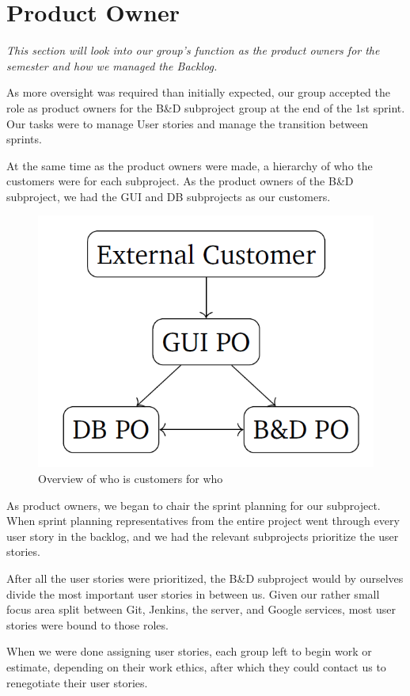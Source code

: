 \section{Product Owner} \label{Roles_SecProductOwner}
\textit{This section will look into our group’s function as the product owners for the semester and how we managed the Backlog.}

As more oversight was required than initially expected, our group accepted the role as product owners for the B\&D subproject group at the end of the 1st sprint. Our tasks were to manage User stories and manage the transition between sprints.

At the same time as the product owners were made, a hierarchy of who the customers were for each subproject. As the product owners of the B\&D subproject, we had the GUI and DB subprojects as our customers.

 \begin{figure}[H]
 	\centering
 	\includegraphics[width=0.8 \textwidth]{pictures/ProductOwnerRelation.png}
 	\caption{Overview of who is customers for who}
 	\label{AppLibependencies}
 \end{figure}
As product owners, we began to chair the sprint planning for our subproject. When sprint planning representatives from the entire project went through every user story in the backlog, and we had the relevant subprojects prioritize the user stories.

After all the user stories were prioritized, the B\&D subproject would by ourselves divide the most important user stories in between us. Given our rather small focus area split between Git, Jenkins, the server, and Google services, most user stories were bound to those roles.

When we were done assigning user stories, each group left to begin work or estimate, depending on their work ethics, after which they could contact us to renegotiate their user stories.

